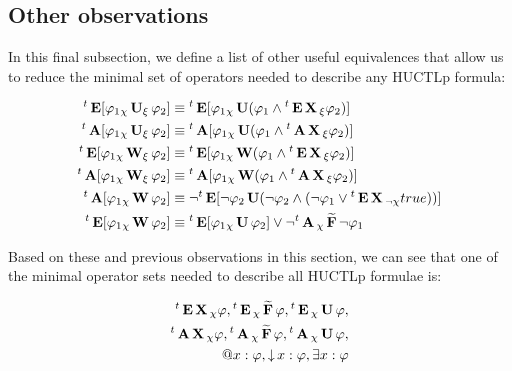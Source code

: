 \subsection{Other observations}
\label{sec:huctlEnd}

In this final subsection, we define a list of other useful equivalences that allow us to reduce the minimal set of operators needed to describe any \ac{HUCTLp} formula:

\begin{align*}
	{}^{t} \operatorname{\mathbf{E}}[\varphi_1 {}_{\chi}\operatorname{\mathbf{U}}_{\xi} \varphi_2]						& \equiv {}^{t} \operatorname{\mathbf{E}}[\varphi_1 {}_{\chi}\operatorname{\mathbf{U}} (\varphi_1 \land {}^{t}\operatorname{\mathbf{E}}\operatorname{\mathbf{X}}{}_{\xi} \varphi_2)] \\
	{}^{t} \operatorname{\mathbf{A}}[\varphi_1 {}_{\chi}\operatorname{\mathbf{U}}_{\xi} \varphi_2]						& \equiv {}^{t} \operatorname{\mathbf{A}}[\varphi_1 {}_{\chi}\operatorname{\mathbf{U}} (\varphi_1 \land {}^{t}\operatorname{\mathbf{A}}\operatorname{\mathbf{X}}{}_{\xi} \varphi_2)] \\
	{}^{t} \operatorname{\mathbf{E}}[\varphi_1 {}_{\chi}\operatorname{\mathbf{W}}_{\xi} \varphi_2]						& \equiv {}^{t} \operatorname{\mathbf{E}}[\varphi_1 {}_{\chi}\operatorname{\mathbf{W}} (\varphi_1 \land {}^{t}\operatorname{\mathbf{E}}\operatorname{\mathbf{X}}{}_{\xi} \varphi_2)] \\
	{}^{t} \operatorname{\mathbf{A}}[\varphi_1 {}_{\chi}\operatorname{\mathbf{W}}_{\xi} \varphi_2]						& \equiv {}^{t} \operatorname{\mathbf{A}}[\varphi_1 {}_{\chi}\operatorname{\mathbf{W}} (\varphi_1 \land {}^{t}\operatorname{\mathbf{A}}\operatorname{\mathbf{X}}{}_{\xi} \varphi_2)] \\
	{}^{t}\operatorname{\mathbf{A}}[\varphi_1 {}_{\chi}\operatorname{\mathbf{W}} \varphi_2] 				  & \equiv \neg {}^{t}\operatorname{\mathbf{E}}[ \neg \varphi_2 \operatorname{\mathbf{U}} (\neg \varphi_2 \land (\neg \varphi_1 \lor {}^{t}\operatorname{\mathbf{E}} \operatorname{\mathbf{X}}{}_{\neg\chi} true)) ] \\
	{}^{t}\operatorname{\mathbf{E}}[\varphi_1 {}_{\chi}\operatorname{\mathbf{W}} \varphi_2] 				  & \equiv {}^{t}\operatorname{\mathbf{E}}[\varphi_1 {}_{\chi}\operatorname{\mathbf{U}} \varphi_2] \lor \neg {}^{t}\operatorname{\mathbf{A}} {}_{\chi}\operatorname{\mathbf{\widetilde{F}}} \neg \varphi_1 \\
\end{align*}

Based on these and previous observations in this section, we can see that one of the minimal operator sets needed to describe all \ac{HUCTLp} formulae is:

\begin{align*}
	{}^{t}\operatorname{\mathbf{E}}\operatorname{\mathbf{X}}{}_{\chi} \varphi, {}^{t}\operatorname{\mathbf{E}}{}_{\chi}\operatorname{\mathbf{\widetilde{F}}} \varphi, {}^{t}\operatorname{\mathbf{E}}{}_{\chi}\operatorname{\mathbf{U}} \varphi, \\
	{}^{t}\operatorname{\mathbf{A}}\operatorname{\mathbf{X}}{}_{\chi} \varphi, {}^{t}\operatorname{\mathbf{A}}{}_{\chi}\operatorname{\mathbf{\widetilde{F}}} \varphi, {}^{t}\operatorname{\mathbf{A}}{}_{\chi}\operatorname{\mathbf{U}} \varphi, \\
	\operatorname{@\!} x : \varphi, \operatorname{\downarrow} x : \varphi, \exists x : \varphi
\end{align*}

